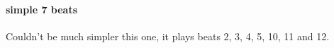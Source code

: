 \paragraph{simple 7 beats}
Couldn't be much simpler this one, it plays beats 2, 3, 4, 5, 10, 11 and 12.
